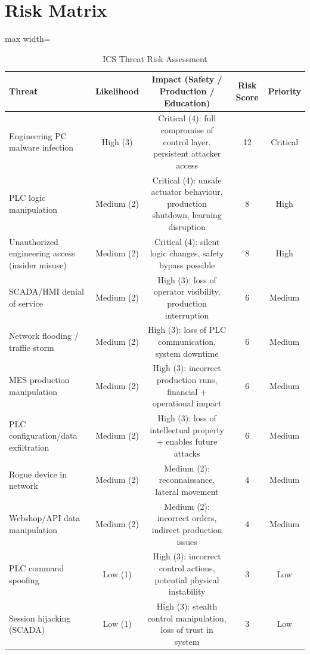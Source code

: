 \section{Risk Matrix}

\begin{table}[H]
\centering

\begin{adjustbox}{max width=\textwidth}
\begin{tabular}{@{}lcccc@{}}
\toprule
\textbf{Threat} & \textbf{Likelihood} & \textbf{Impact (Safety / Production / Education)} & \textbf{Risk Score} & \textbf{Priority} \\
\midrule
Engineering PC malware infection & High (3) & Critical (4): full compromise of control layer, persistent attacker access & 12 & Critical \\
PLC logic manipulation & Medium (2) & Critical (4): unsafe actuator behaviour, production shutdown, learning disruption & 8 & High \\
Unauthorized engineering access (insider misuse) & Medium (2) & Critical (4): silent logic changes, safety bypass possible & 8 & High \\
SCADA/HMI denial of service & Medium (2) & High (3): loss of operator visibility, production interruption & 6 & Medium \\
Network flooding / traffic storm & Medium (2) & High (3): loss of PLC communication, system downtime & 6 & Medium \\
MES production manipulation & Medium (2) & High (3): incorrect production runs, financial + operational impact & 6 & Medium \\
PLC configuration/data exfiltration & Medium (2) & High (3): loss of intellectual property + enables future attacks & 6 & Medium \\
Rogue device in network & Medium (2) & Medium (2): reconnaissance, lateral movement & 4 & Medium \\
Webshop/API data manipulation & Medium (2) & Medium (2): incorrect orders, indirect production issues & 4 & Medium \\
PLC command spoofing & Low (1) & High (3): incorrect control actions, potential physical instability & 3 & Low \\
Session hijacking (SCADA) & Low (1) & High (3): stealth control manipulation, loss of trust in system & 3 & Low \\
\bottomrule
\end{tabular}
\end{adjustbox}
\caption{ICS Threat Risk Assessment}
\end{table}
